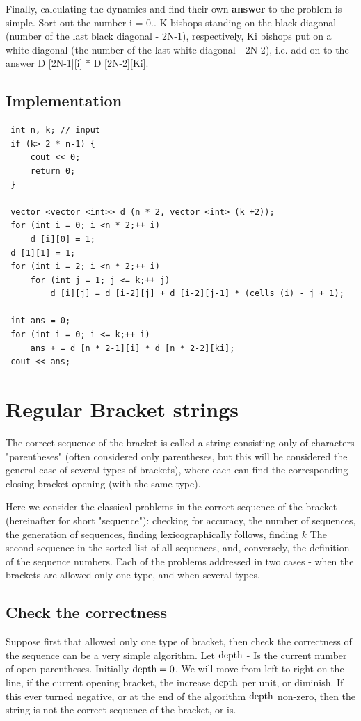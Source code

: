 Finally, calculating the dynamics and find their own \textbf{answer} to the problem is simple. Sort out the number i = 0.. K bishops standing on the black diagonal (number of the last black diagonal - 2N-1), respectively, Ki bishops put on a white diagonal (the number of the last white diagonal - 2N-2), i.e. add-on to the answer D [2N-1][i] * D [2N-2][Ki].

\subsection{ Implementation }

 \begin{verbatim}
 int n, k; // input
 if (k> 2 * n-1) {
     cout << 0;
     return 0;
 }

 vector <vector <int>> d (n * 2, vector <int> (k +2));
 for (int i = 0; i <n * 2;++ i)
     d [i][0] = 1;
 d [1][1] = 1;
 for (int i = 2; i <n * 2;++ i)
     for (int j = 1; j <= k;++ j)
         d [i][j] = d [i-2][j] + d [i-2][j-1] * (cells (i) - j + 1);

 int ans = 0;
 for (int i = 0; i <= k;++ i)
     ans + = d [n * 2-1][i] * d [n * 2-2][ki];
 cout << ans; 
\end{verbatim}

\section{ Regular Bracket strings }
The correct sequence of the bracket is called a string consisting only of characters "parentheses" (often considered only parentheses, but this will be considered the general case of several types of brackets), where each can find the corresponding closing bracket opening (with the same type).

Here we consider the classical problems in the correct sequence of the bracket (hereinafter for short "sequence"): checking for accuracy, the number of sequences, the generation of sequences, finding lexicographically follows, finding $k$ The second sequence in the sorted list of all sequences, and, conversely, the definition of the sequence numbers. Each of the problems addressed in two cases - when the brackets are allowed only one type, and when several types.

\subsection{ Check the correctness }

Suppose first that allowed only one type of bracket, then check the correctness of the sequence can be a very simple algorithm. Let $\rm depth$ - Is the current number of open parentheses. Initially $\rm depth = 0$. We will move from left to right on the line, if the current opening bracket, the increase $\rm depth$ per unit, or diminish. If this ever turned negative, or at the end of the algorithm $\rm depth$ non-zero, then the string is not the correct sequence of the bracket, or is.

